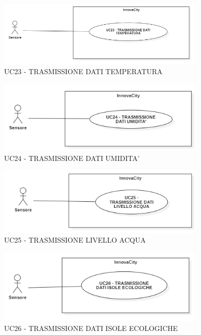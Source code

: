 \begin{figure}[H]
    \centering
    \includegraphics[width=0.9\textwidth]{../Images/uc23.PNG}
    \caption{UC23 - TRASMISSIONE DATI TEMPERATURA }
\end{figure}



\begin{figure}[H]
    \centering
    \includegraphics[width=0.9\textwidth]{../Images/uc24.PNG}
    \caption{UC24 - TRASMISSIONE DATI UMIDITA' }
\end{figure}



\begin{figure}[H]
    \centering
    \includegraphics[width=0.9\textwidth]{../Images/uc25.PNG}
    \caption{UC25 - TRASMISSIONE LIVELLO ACQUA }
\end{figure}



\begin{figure}[H]
    \centering
    \includegraphics[width=0.9\textwidth]{../Images/uc26.PNG}
    \caption{UC26 - TRASMISSIONE DATI ISOLE ECOLOGICHE }
\end{figure}


